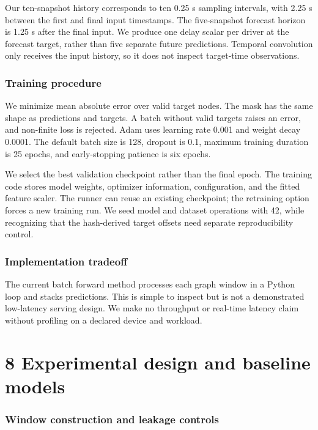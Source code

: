 \documentclass[11pt,a4paper,oneside]{report}
\begin{document}
Our ten-snapshot history corresponds to ten 0.25 s sampling intervals, with 2.25 s between the first and final input timestamps. The five-snapshot forecast horizon is 1.25 s after the final input. We produce one delay scalar per driver at the forecast target, rather than five separate future predictions. Temporal convolution only receives the input history, so it does not inspect target-time observations.

\subsection*{Training procedure}

We minimize mean absolute error over valid target nodes. The mask has the same shape as predictions and targets. A batch without valid targets raises an error, and non-finite loss is rejected. Adam uses learning rate 0.001 and weight decay 0.0001. The default batch size is 128, dropout is 0.1, maximum training duration is 25 epochs, and early-stopping patience is six epochs.

We select the best validation checkpoint rather than the final epoch. The training code stores model weights, optimizer information, configuration, and the fitted feature scaler. The runner can reuse an existing checkpoint; the retraining option forces a new training run. We seed model and dataset operations with 42, while recognizing that the hash-derived target offsets need separate reproducibility control.

\subsection*{Implementation tradeoff}

The current batch forward method processes each graph window in a Python loop and stacks predictions. This is simple to inspect but is not a demonstrated low-latency serving design. We make no throughput or real-time latency claim without profiling on a declared device and workload.

\clearpage

\clearpage\chapter*{8 Experimental design and baseline models}

\subsection*{Window construction and leakage controls}
\end{document}
